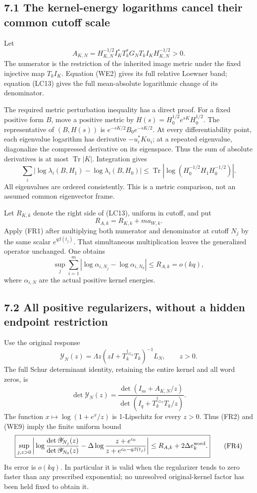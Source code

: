 \documentclass[10pt]{article}
\begin{document}
\subsection{7.1 The kernel-energy logarithms cancel their common cutoff scale}\label{the-kernel-energy-logarithms-cancel-their-common-cutoff-scale}

Let \[
 A_{K,N}=H_{K,N}^{-1/2}I_K^*T_k^*G_NT_kI_KH_{K,N}^{-1/2}>0.
\] The numerator is the restriction of the inherited image metric under the fixed injective map \(T_kI_K\). Equation (WE2) gives its full relative Loewner band; equation (LC13) gives the full mean-absolute logarithmic change of its denominator.

The required metric perturbation inequality has a direct proof. For a fixed positive form \(B\), move a positive metric by \(H(s)=H_0^{1/2}e^{sK}H_0^{1/2}\). The representative of \((B,H(s))\) is \(e^{-sK/2}B_0e^{-sK/2}\). At every differentiability point, each eigenvalue logarithm has derivative \(-u_i^*Ku_i\); at a repeated eigenvalue, diagonalize the compressed derivative on its eigenspace. Thus the sum of absolute derivatives is at most \(\operatorname{Tr}|K|\). Integration gives \[
 \sum_i|\log\lambda_i(B,H_1)-\log\lambda_i(B,H_0)|
 \le\operatorname{Tr}|\log(H_0^{-1/2}H_1H_0^{-1/2})|.
 \tag{FR1}
\] All eigenvalues are ordered consistently. This is a metric comparison, not an assumed common eigenvector frame.

Let \(R_{K,k}\) denote the right side of (LC13), uniform in cutoff, and put \[
 R_{A,k}=R_{K,k}+m a_{W,k}.
\] Apply (FR1) after multiplying both numerator and denominator at cutoff \(N_j\) by the same scalar \(e^{q\beta(t_j)}\). That simultaneous multiplication leaves the generalized operator unchanged. One obtains \[
 \boxed{\sup_j\sum_{i=1}^m
 |\log\alpha_{i,N_j}-\log\alpha_{i,N_0}|
 \le R_{A,k}=o(kq),}
 \tag{FR2}
\] where \(\alpha_{i,N}\) are the actual positive kernel energies.

\subsection{7.2 All positive regularizers, without a hidden endpoint restriction}\label{all-positive-regularizers-without-a-hidden-endpoint-restriction}

Use the original response \[
 \mathscr Y_N(z)=\Lambda z(zI+T_k^{\dagger_{G_N}}T_k)^{-1}L_N,
 \qquad z>0.
\] The full Schur determinant identity, retaining the entire kernel and all word zeros, is \[
 \det\mathscr Y_N(z)=
 \frac{\det(I_m+A_{K,N}/z)}
 {\det(I_q+T_k^{\dagger_{G_N}}T_k/z)}.
 \tag{FR3}
\] The function \(x\mapsto\log(1+e^x/z)\) is 1-Lipschitz for every \(z>0\). Thus (FR2) and (WE9) imply the finite uniform bound \[
 \boxed{\begin{split}
 \sup_{j,z>0}\bigg|\log\frac{\det\mathscr Y_{N_j}(z)}
 {\det\mathscr Y_{N_0}(z)}
 -\Delta\log\frac{z+e^{c_0}}{z+e^{c_0-q\beta(t_j)}}\bigg|
 \le R_{A,k}+2\Delta e_k^{\rm word}.
 \end{split}}
 \tag{FR4}
\] Its error is \(o(kq)\). In particular it is valid when the regularizer tends to zero faster than any prescribed exponential; no unresolved original-kernel factor has been held fixed to obtain it.
\end{document}
